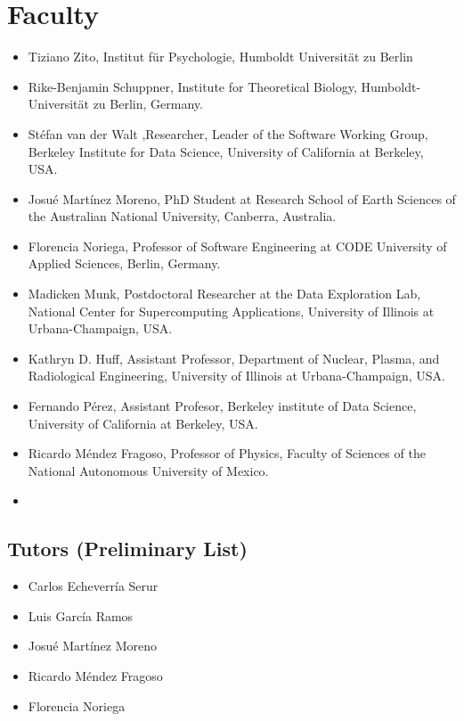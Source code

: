 \documentclass{article}[11pt]
\begin{document}
\section*{Faculty}
\begin{itemize} 
    \item Tiziano Zito, Institut f\"ur Psychologie, Humboldt Universit\"at zu Berlin    
    \item Rike-Benjamin Schuppner, Institute for Theoretical Biology, Humboldt-Universit\"at zu Berlin, Germany.
    \item St\'efan van der Walt ,Researcher, Leader of the Software Working Group, Berkeley Institute for Data Science, University of California at Berkeley, USA.
    \item Josu\'e Mart\'inez Moreno, PhD Student at Research School of Earth Sciences of the Australian National University, Canberra, Australia.
    \item  Florencia Noriega, Professor of Software Engineering at CODE University of Applied Sciences, Berlin, Germany.
    \item Madicken Munk, Postdoctoral Researcher at the  Data Exploration Lab, National Center for Supercomputing Applications, University of Illinois at Urbana-Champaign, USA.
    \item Kathryn D. Huff, Assistant Professor, Department of Nuclear, Plasma, and Radiological Engineering, University of Illinois at Urbana-Champaign, USA.
    \item Fernando P\'erez, Assistant Profesor, Berkeley institute of Data Science, University of California at Berkeley, USA.
    \item Ricardo M\'endez Fragoso, Professor of Physics, Faculty of Sciences of the National Autonomous University of Mexico.
    \item {}
\end{itemize}

\subsection*{Tutors (Preliminary List)}
\begin{itemize}
\item Carlos Echeverr\'ia Serur
\item Luis Garc\'ia Ramos
\item Josué Martínez Moreno
\item Ricardo Méndez Fragoso
\item Florencia Noriega
\end{itemize}
\end{document}
